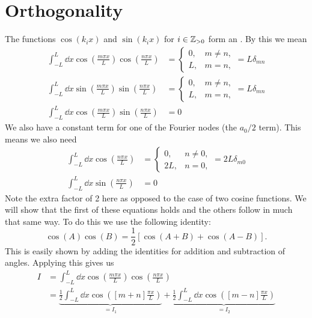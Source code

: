\documentclass[a4paper]{article}
\begin{document}
    \section{Orthogonality}
    The functions \(\cos(k_ix)\) and \(\sin(k_ix)\) for \(i\in\mathbb{Z}_{>0}\) form an .
    By this we mean
    \begin{align*}
        \int_{-L}^{L} \dd{x}\cos\left(\frac{m\pi x}{L}\right) \cos\left(\frac{n\pi x}{L}\right) &= 
        \begin{cases}
            0, & m \ne n,\\
            L, & m = n,
        \end{cases}
        = L\delta_{mn}\\
        \int_{-L}^{L} \dd{x}\sin\left(\frac{m\pi x}{L}\right) \sin\left(\frac{n\pi x}{L}\right) &= 
        \begin{cases}
            0, & m \ne n,\\
            L, & m = n,
        \end{cases}
        = L\delta_{mn}\\
        \int_{-L}^{L} \dd{x}\cos\left(\frac{m\pi x}{L}\right)\sin\left(\frac{n\pi x}{L}\right) &= 0
    \end{align*}
    We also have a constant term for one of the Fourier nodes (the \(a_0/2\) term).
    This means we also need
    \begin{align*}
        \int_{-L}^{L} \dd{x} \cos\left(\frac{n\pi x}{L}\right) &= 
        \begin{cases}
            0, &n \ne 0,\\
            2L, &n = 0,
        \end{cases}
        = 2L\delta_{m0}\\
        \int_{-L}^{L} \dd{x} \sin\left(\frac{n\pi x}{L}\right) &= 0
    \end{align*}
    Note the extra factor of 2 here as opposed to the case of two cosine functions.
    We will show that the first of these equations holds and the others follow in much that same way.
    To do this we use the following identity:
    \[\cos(A)\cos(B) = \frac{1}{2}\left[\cos(A + B) + \cos(A - B)\right].\]
    This is easily shown by adding the identities for addition and subtraction of angles.
    Applying this gives us
    \begin{align*}
        I &= \int_{-L}^{L} \dd{x} \cos\left(\frac{m\pi x}{L}\right) \cos\left(\frac{n\pi x}{L}\right)\\
        &= \underbrace{\frac{1}{2} \int_{-L}^{L} \dd{x} \cos\left([m + n]\frac{\pi x}{L}\right)}_{= I_1} + \underbrace{\frac{1}{2} \int_{-L}^L \dd{x} \cos\left([m - n]\frac{\pi x}{L}\right)}_{= I_2}
    \end{align*}
\end{document}
